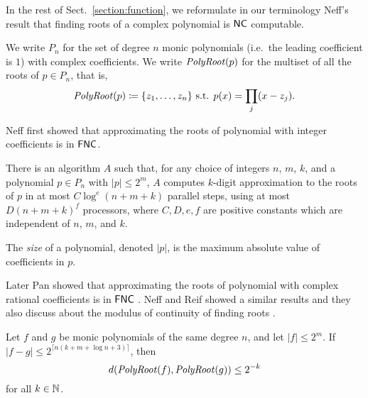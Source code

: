 \documentclass[envcountsame,orivec,oribibl]{llncs}
\begin{document}
In the rest of Sect.~\ref{section:function}, 
we reformulate in our terminology Neff's result that 
finding roots of a complex polynomial is $\mathsf{NC}$ computable. 

We write $P_n$ for the set of degree $n$ monic 
polynomials (i.e.\ the leading coefficient is $1$) with complex coefficients.
We write $\mathit{PolyRoot}(p)$ for the multiset of all the roots of $p \in P_n$, that is,
\begin{equation}
 \mathit{PolyRoot}(p) \coloneqq \{ z_1, \dots, z_n \} \text{ s.t. } p(x) = \prod_j (x - z_j).
\end{equation}

Neff first showed that approximating the roots of polynomial
with integer coefficients is in $\mathsf{FNC}$.
\begin{theorem}
\label{theorem:neff1994}
There is an algorithm $A$ such that,
for any choice of integers $n$, $m$, $k$, and a polynomial $p \in P_n$
with $|p| \le 2^m$,
$A$ computes $k$-digit approximation to the roots of $p$ 
in at most $C \log^e(n + m + k)$ parallel steps, 
using at most $D(n + m + k)^f$ processors, where $C, D, e, f$ are positive
constants which are independent of $n$, $m$, and $k$.
\end{theorem}
The \emph{size} of a polynomial, denoted $|p|$, is the maximum absolute value
 of coefficients in $p$.

Later Pan showed that approximating the roots of polynomial
with complex rational coefficients is in $\mathsf{FNC}$ \cite{pan1995optimal}.
Neff and Reif showed a similar results and they also discuss
about the modulus of continuity of finding roots \cite{neff1996efficient}.

\begin{theorem}
 Let $f$ and $g$ be monic polynomials of the same degree $n$,
 and let $|f| \le 2^m$.
 If $|f - g| \le 2^{\lceil n(k + m + \log n + 3)\rceil}$, then
 \begin{equation}
  d(\mathit{PolyRoot}(f), \mathit{PolyRoot}(g)) \le 2^{-k} 
 \end{equation}
 for all $k \in \mathbb N$.
\end{theorem}
\end{document}
